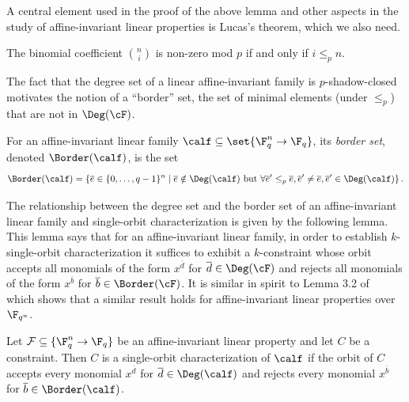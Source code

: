 A central element used in the proof of the above lemma and
other aspects in the study of affine-invariant linear properties is
Lucas's theorem, which we also need.

\begin{theorem}\label{thm:luca}
The %
binomial
coefficient $\binom {n} {i} $ is non-zero mod $p$ if and only if $i \leq_p n$.
\end{theorem}

The fact that the degree set of a linear affine-invariant family is $p$-shadow-closed 
motivates the notion of a ``border'' set, the set of minimal elements (under $\leq_p$) that are not in $\Deg(\cF)$.
\begin{definition}[Border]\label{defn:border}
For an affine-invariant linear family $\calf \subseteq \set{\F_q^n \to \F_q}$, its \emph{border set}, denoted $\Border(\calf)$,
is the set \[\Border(\calf) = \{\overline e \in \{0,\ldots,q-1\}^n \;|\; \overline e \notin \Deg(\calf) \text{~but~}
\forall \overline e' \leq_p \overline e, \overline e'\ne \overline e, \overline e' \in \Deg(\calf)\}\,.\]
\end{definition}

The relationship between the degree set and the border set of an affine-invariant linear family and single-orbit characterization is given by the following lemma.
This lemma  says that for an affine-invariant linear family, in order to establish $k$-single-orbit characterization it suffices to exhibit a $k$-constraint whose orbit accepts
all monomials of the form $x^{\overline d}$ for
 $\overline d \in \Deg(\cF)$ and  rejects all monomials of the form $x^{\overline b}$ for
  $\overline b \in \Border(\cF)$. It is similar in spirit to Lemma 3.2 of~\cite{BGMSS11} which shows that a similar result holds for affine-invariant linear properties over $\F_{q^n}$.

\begin{lemma}\label{lem:border-single-orbit}
Let $\mathcal{F} \subseteq \{\F_q^n \to \F_q\}$ be an
affine-invariant linear property and let $C$ be a constraint.
Then $C$ is a single-orbit characterization of $\calf$ if the orbit of
$C$ accepts every monomial $x^{\overline d}$ for $\overline d \in \Deg(\calf)$ and
rejects every monomial $x^{\overline b}$ for $\overline b \in \Border(\calf)$.
\end{lemma}

